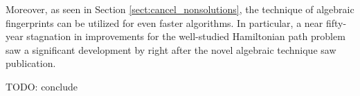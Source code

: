 Moreover, as seen in Section \ref{sect:cancel_nonsolutions}, 
the technique of algebraic fingerprints can be utilized for even 
faster algorithms. In particular, a near fifty-year stagnation 
in improvements for the well-studied Hamiltonian path problem saw 
a significant development by \citeauthor{Björklund14} right after 
the novel algebraic technique \cite{Koutis08} saw publication.

TODO: conclude